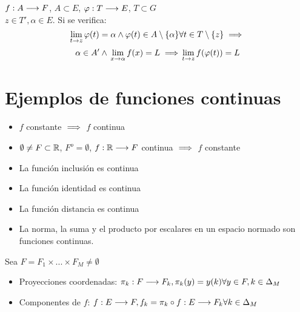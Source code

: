 \begin{prop}
    $f:A\longrightarrow F$, $A\subset E$, $\varphi :T\longrightarrow E$, $T \subset G$\\
    $z \in T', \alpha\in E$. Si se verifica:
    $$\lim_{t\to z}\varphi(t) = \alpha \\ \land \\ \varphi(t) \in A\setminus \{\alpha\}\\ \forall t \in T\setminus \{z\} \implies$$ 
    $$\alpha\in A' \\ \land \\ \lim_{x\to \alpha}f(x) = L \\ \implies \\ \lim_{t\to z} f(\varphi(t)) = L$$
\end{prop}

\section{Ejemplos de funciones continuas}
\begin{itemize}
    \item $f$ constante $\implies$ $f$ continua
    \item $\emptyset \neq F \subset \mathbb R$, $F^o = \emptyset$, $f:\mathbb R \longrightarrow F$ continua $\implies$ $f$ constante
    \item La función inclusión es continua
    \item La función identidad es continua
    \item La función distancia es continua
    \item La norma, la suma y el producto por escalares en un espacio normado son funciones continuas.
\end{itemize}

\begin{definicion}
    Sea $F=F_1\times...\times F_M \neq \emptyset$ 
    \begin{itemize}
        \item Proyecciones coordenadas:
        $\pi_k:F\longrightarrow F_k, \\ \pi_k(y) = y(k) \\ \forall y \in F, \\ k \in \Delta_M$
        \item Componentes de $f$:
        $f:E \longrightarrow F, \\ f_k=\pi_k\circ f:E\longrightarrow F_k\\ \forall k \in \Delta_M$
    \end{itemize}
\end{definicion}

